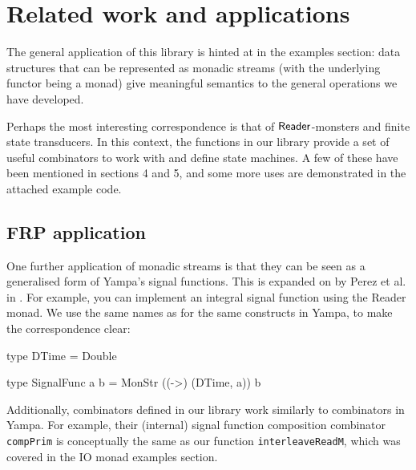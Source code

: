 
\section{Related work and applications}

The general application of this library is hinted at in the examples section: data structures that can be represented as monadic streams (with the underlying functor being a monad) give meaningful semantics to the general operations we have developed.

Perhaps the most interesting correspondence is that of $\mathsf{Reader}$-monsters and finite state transducers. In this context, the functions in our library provide a set of useful combinators to work with and define state machines. A few of these have been mentioned in sections 4 and 5, and some more uses are demonstrated in the attached example code.

\subsection{FRP application}

One further application of monadic streams is that they can be seen as a generalised form of Yampa's \cite{yampa_arcade} signal functions. This is expanded on by Perez et al. in \cite{frp_refactored}. For example, you can implement an integral signal function using the Reader monad. We use the same names as for the same constructs in Yampa, to make the correspondence clear:

\begin{haskell}
type DTime = Double

type SignalFunc a b = MonStr ((->) (DTime, a)) b
\end{haskell}


Additionally, combinators defined in our library work similarly to combinators in Yampa. For example, their (internal) signal function composition combinator \verb+compPrim+ is conceptually the same as our function \verb+interleaveReadM+, which was covered in the IO monad examples section.

